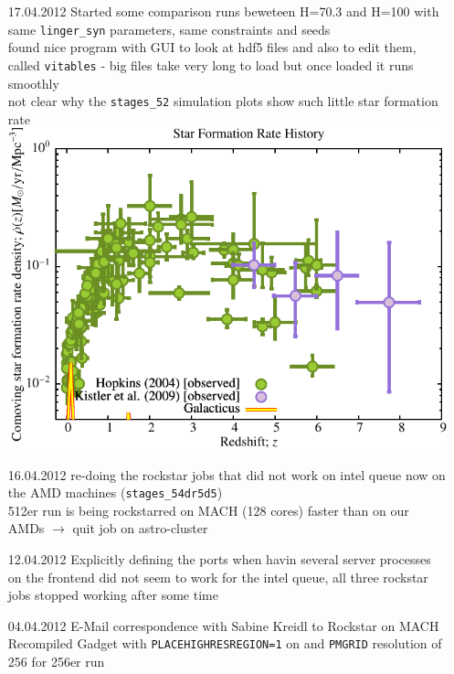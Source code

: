 \documentclass[a4paper,11pt,fleqn,oneside]{book}
\begin{document}
\begin{itemize}
\item[17.04.2012]
Started some comparison runs beweteen H=70.3 and H=100 with same 
\texttt{linger\_syn} parameters, same constraints and seeds \\
found nice program with GUI to look at hdf5 files and also to edit them, 
called \texttt{vitables} - big files take very long to load but 
once loaded it runs smoothly \\
not clear why the \texttt{stages\_52} simulation plots show 
such little star formation rate 
\includegraphics[scale=0.5]{r256/h100/stages_52/Plot_Star_Formation_History_small.pdf} \\

\item[16.04.2012]
re-doing the rockstar jobs that did not work on intel queue 
now on the AMD machines (\texttt{stages\_54dr5d5}) \\ 
512er run is being rockstarred on MACH (128 cores) faster than on 
our AMDs $\rightarrow$ quit job on astro-cluster \\

\item[12.04.2012]
Explicitly defining the ports when havin several server processes on
the frontend did not seem to work for the intel queue, all 
three rockstar jobs stopped working after some time \\

\item[04.04.2012]
E-Mail correspondence with Sabine Kreidl to Rockstar on MACH \\
Recompiled Gadget with \texttt{PLACEHIGHRESREGION=1} on and 
\texttt{PMGRID} resolution of 256 for 256er run \\


\end{itemize}
\end{document}
